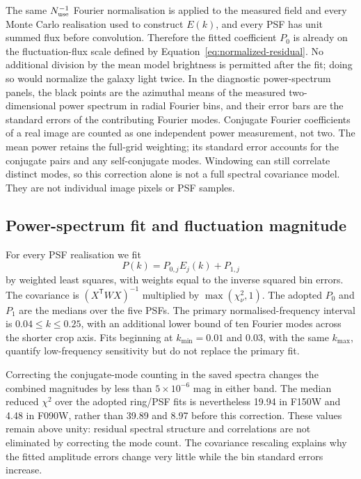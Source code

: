 \documentclass[nodoi,nocopyright]{pas}
\begin{document}
The same $N_{\rm use}^{-1}$ Fourier normalisation is applied to the measured
field and every Monte Carlo realisation used to construct $E(k)$, and every
PSF has unit summed flux before convolution. Therefore the fitted coefficient
$P_0$ is already on the fluctuation-flux scale defined by
Equation~\ref{eq:normalized-residual}. No additional division by the mean model
brightness is permitted after the fit; doing so would normalize the galaxy
light twice. In the diagnostic power-spectrum panels, the black points are the
azimuthal means of the measured two-dimensional power spectrum in radial
Fourier bins, and their error bars are the standard errors of the contributing
Fourier modes. Conjugate Fourier coefficients of a real image are counted
as one independent power measurement, not two. The mean power retains the
full-grid weighting; its standard error accounts for the conjugate pairs
and any self-conjugate modes. Windowing can still correlate distinct modes,
so this correction alone is not a full spectral covariance model.
They are not individual image pixels or PSF samples.

\subsection{Power-spectrum fit and fluctuation magnitude}

For every PSF realisation we fit
\begin{equation}
 P(k)=P_{0,j}E_j(k)+P_{1,j}
 \label{eq:power-fit}
\end{equation}
by weighted least squares, with weights equal to the inverse squared bin
errors. The covariance is $(X^{\mathsf T}WX)^{-1}$ multiplied by
$\max(\chi^2_\nu,1)$. The adopted $P_0$ and $P_1$ are the medians over the five
PSFs. The primary normalised-frequency interval is $0.04\leq k\leq0.25$, with
an additional lower bound of ten Fourier modes across the shorter crop axis.
Fits beginning at $k_{\min}=0.01$ and 0.03, with the same $k_{\max}$, quantify
low-frequency sensitivity but do not replace the primary fit.

Correcting the conjugate-mode counting in the saved spectra changes the
combined magnitudes by less than $5\times10^{-6}$ mag in either band.
The median reduced $\chi^2$ over the adopted ring/PSF fits is nevertheless
19.94 in F150W and 4.48 in F090W, rather than 39.89 and 8.97 before this
correction. These values remain above unity: residual spectral structure
and correlations are not eliminated by correcting the mode count.
The covariance rescaling explains why the fitted amplitude errors change
very little while the bin standard errors increase.
\end{document}
